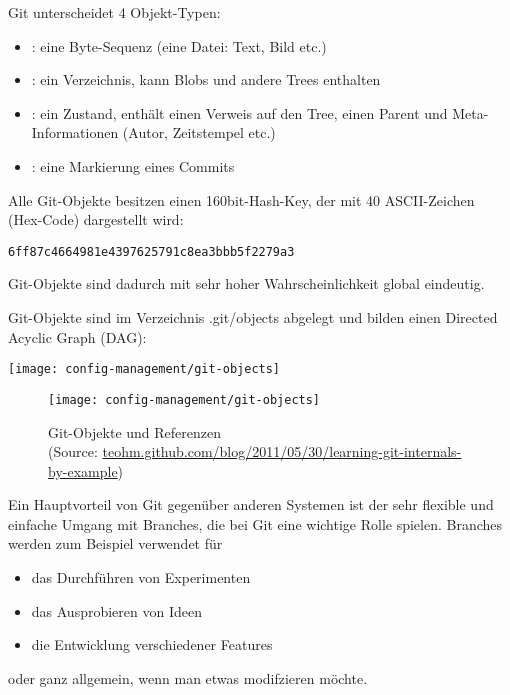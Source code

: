 %

%

Git unterscheidet 4 Objekt-Typen:
\begin{itemize}
\item {}: eine Byte-Sequenz (eine Datei: Text, Bild etc.)
\item {}: ein Verzeichnis, kann Blobs und andere Trees enthalten
\item {}: ein Zustand, enthält einen Verweis auf den Tree, einen
  Parent und Meta-Informationen (Autor, Zeitstempel etc.)
\item {}: eine Markierung eines Commits
\end{itemize}
Alle Git-Objekte besitzen einen 160bit-Hash-Key, der
 mit 40 ASCII-Zeichen (Hex-Code)
dargestellt wird:
\begin{lstlisting}
6ff87c4664981e4397625791c8ea3bbb5f2279a3
\end{lstlisting}
Git-Objekte sind dadurch mit sehr hoher Wahrscheinlichkeit global
eindeutig.

\newslide
Git-Objekte sind im Verzeichnis .git/objects abgelegt und bilden einen
Directed Acyclic Graph (DAG):
\ifslides
\begin{center}
  \texttt{[image: config-management/git-objects]}
\end{center}
\else
\begin{figure}[H]
  \centering
  \texttt{[image: config-management/git-objects]}
  \caption[Git-Objekte und Referenzen]{Git-Objekte und Referenzen \\
(Source: \href{http://teohm.github.com/blog/2011/05/30/learning-git-internals-by-example}
                {teohm.github.com/blog/2011/05/30/learning-git-internals-by-example})}
  \label{fig:gitobjects}
\end{figure}
\fi
\newslide
Ein Hauptvorteil von Git gegenüber anderen Systemen ist der sehr
flexible und einfache Umgang mit Branches, die bei
Git eine wichtige Rolle spielen. Branches werden
zum Beispiel verwendet für
\begin{itemize}
\item das Durchführen von Experimenten
\item das Ausprobieren von Ideen
\item die Entwicklung verschiedener Features
\end{itemize}
oder ganz allgemein, wenn man etwas modifzieren möchte.

